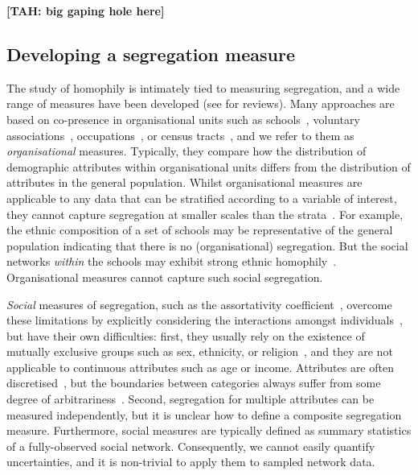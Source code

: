 \documentclass{scrartcl}
\newcommand{\tah}[1]{\textbf{[TAH: #1]}}
\begin{document}
\tah{big gaping hole here}

\subsection{Developing a segregation measure}

The study of homophily is intimately tied to measuring segregation, and a wide range of measures have been developed (see \textcite{Rodriguez-Moral2016, Bojanowski2014} for reviews). Many approaches are based on co-presence in organisational units such as schools~\cite{Orfield2014}, voluntary associations~\cite{Popielarz1999}, occupations~\cite{Charles1995}, or census tracts~\cite{Reardon2004,Reardon2011}, and we refer to them as \emph{organisational} measures. Typically, they compare how the distribution of demographic attributes within organisational units differs from the distribution of attributes in the general population. Whilst organisational measures are applicable to any data that can be stratified according to a variable of interest, they cannot capture segregation at smaller scales than the strata~\cite{Blumenstock2013}. For example, the ethnic composition of a set of schools may be representative of the general population indicating that there is no (organisational) segregation. But the social networks \emph{within} the schools may exhibit strong ethnic homophily~\cite{Currarini2009,Moody2001}.
Organisational measures cannot capture such social segregation.

\emph{Social} measures of segregation, such as the assortativity coefficient~\cite{Newman2003a}, overcome these limitations by explicitly considering the interactions amongst individuals~\cite{Blumenstock2013}, but have their own difficulties: first, they usually rely on the existence of mutually exclusive groups such as sex, ethnicity, or religion~\cite{Bojanowski2014}, and they are not applicable to continuous attributes such as age or income. Attributes are often discretised~\cite{Lam-Morgan2012, Kalmijn2007, Kim2012},
but the boundaries between categories always suffer from some degree of arbitrariness~\cite{Reardon2004}. Second, segregation for multiple attributes can be measured independently, but it is unclear how to define a composite segregation measure. Furthermore, social measures are typically defined as summary statistics of a fully-observed social network. Consequently, we cannot easily quantify uncertainties, and it is non-trivial to apply them to sampled network data.
\end{document}
